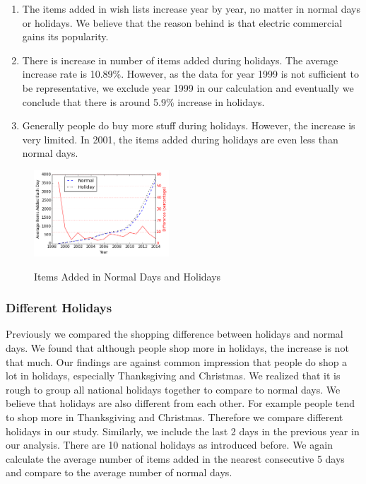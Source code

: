\begin{enumerate}
\item The items added in wish lists increase year by year, no matter in normal days or holidays. We believe that the reason behind is that electric commercial gains its popularity.
\item There is increase in number of items added during holidays. The average increase rate is 10.89\%. However, as the data for year 1999 is not sufficient to be representative, we exclude year 1999 in our calculation and eventually we conclude that there is around 5.9\% increase in holidays. 
\item Generally people do buy more stuff during holidays. However, the increase is very limited. In 2001, the items added during holidays are even less than normal days. 
\end{enumerate}


\begin{figure}[h!]
\centering
  \caption{Items Added in Normal Days and Holidays}{}
  \label{fig:holiday}
  \centering
    \includegraphics[width=0.45\textwidth]{holiday.png}
\end{figure}


\subsubsection{Different Holidays}
Previously we compared the shopping difference between holidays and normal days. We found that although people shop more in holidays, the increase is not that much. Our findings are against common impression that people do shop a lot in holidays, especially Thanksgiving and Christmas. We realized that it is rough to group all national holidays together to compare to normal days. We believe that holidays are also different from each other. For example people tend to shop more in Thanksgiving and Christmas. Therefore we compare different holidays in our study. Similarly, we include the last 2 days in the previous year in our analysis. There are 10 national holidays as introduced before. We again calculate the average number of items added in the nearest consecutive 5 days and compare to the average number of normal days. 

